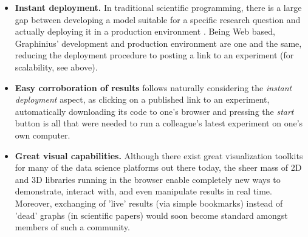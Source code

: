 \begin{itemize}
	\item \textbf{Instant deployment.} In traditional scientific programming, there is a large gap between developing a model suitable for a specific research question and actually deploying it in a production environment \citep{AnalLifecycle}. Being Web based, Graphinius' development and production environment are one and the same, reducing the deployment procedure to posting a link to an experiment (for scalability, see above).
	
	\item \textbf{Easy corroboration of results} follows naturally considering the \textit{instant deployment} aspect, as clicking on a published link to an experiment, automatically downloading its code to one's browser and pressing the \textit{start} button is all that were needed to run a colleague's latest experiment on one's own computer.
	
	\item \textbf{Great visual capabilities.} Although there exist great visualization toolkits for many of the data science platforms out there today, the sheer mass of 2D and 3D libraries running in the browser enable completely new ways to demonstrate, interact with, and even manipulate results in real time. Moreover, exchanging of 'live' results (via simple bookmarks) instead of 'dead' graphs (in scientific papers) would soon become standard amongst members of such a community.
\end{itemize}
